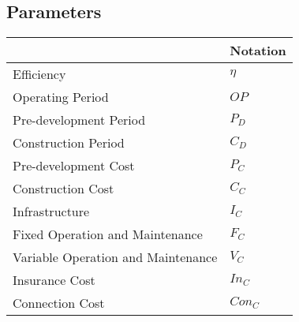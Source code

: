 \subsection{Parameters}

\begin{table}[]
	\begin{tabular}{|l|l|}
		\hline
		\textbf{} & \textbf{Notation} \\ \hline
		Efficiency & $\eta$ \\ \hline
		Operating Period & $OP$ \\ \hline
		Pre-development Period & $P_D$ \\ \hline
		Construction Period & $C_D$ \\ \hline
		Pre-development Cost & $P_C$ \\ \hline
		Construction Cost & $C_C$ \\ \hline
		Infrastructure & $I_C$ \\ \hline
		Fixed Operation and Maintenance & $F_C$ \\ \hline
		Variable Operation and Maintenance & $V_C$ \\ \hline
		Insurance Cost & $In_C$ \\ \hline
		Connection Cost & $Con_C$ \\ \hline
	\end{tabular}
\end{table}



